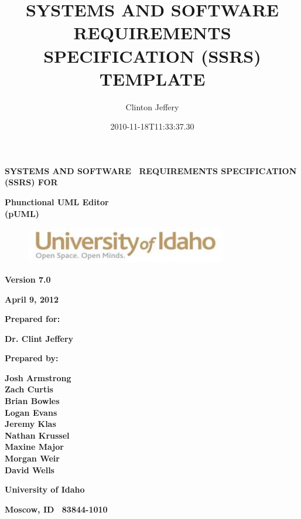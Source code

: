 \documentclass[twoside,letterpaper]{article}
\title{SYSTEMS AND SOFTWARE REQUIREMENTS SPECIFICATION (SSRS) TEMPLATE}
\author{Clinton Jeffery}
\date{2010-11-18T11:33:37.30}
\begin{document}
\clearpage
{\centering\bfseries
SYSTEMS AND SOFTWARE \ REQUIREMENTS SPECIFICATION (SSRS) FOR
\par}


\bigskip

{\centering\bfseries
Phunctional UML Editor
\\(pUML)
\par}


\bigskip


\bigskip


\bigskip

\begin{figure}
\centering
\includegraphics[width=3.5in]{uidahologo.jpg}
\end{figure}

\bigskip


\bigskip

{\centering\bfseries
Version 7.0
\par}

{\centering\bfseries
April 9, 2012
\par}


\bigskip


\bigskip

{\centering\bfseries
Prepared for:
\par}
{\centering\bfseries
Dr. Clint Jeffery
\par}

\bigskip


\bigskip

{\centering\bfseries
Prepared by:
\par}

{\centering\bfseries
Josh Armstrong
\\Zach Curtis
\\Brian Bowles
\\Logan Evans
\\Jeremy Klas
\\Nathan Krussel
\\Maxine Major
\\Morgan Weir
\\David Wells
\par}

{\centering\bfseries
University of Idaho
\par}

{\centering\bfseries
Moscow, ID \ 83844-1010
\par}
\end{document}
